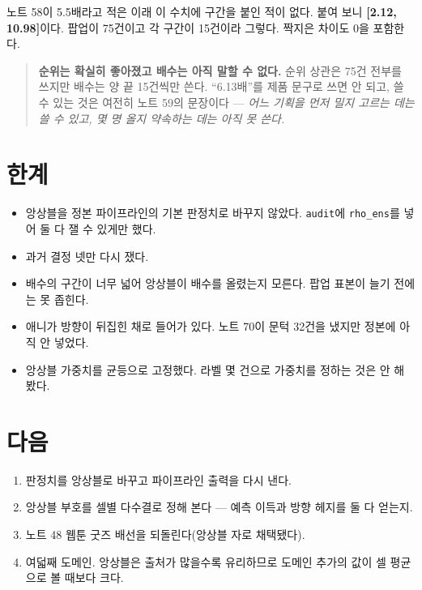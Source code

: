\documentclass[10pt]{article}
\begin{document}
노트 58이 5.5배라고 적은 이래 이 수치에 구간을 붙인 적이 없다. 붙여 보니
\textbf{{[}2.12, 10.98{]}}이다. 팝업이 75건이고 각 구간이 15건이라 그렇다.
짝지은 차이도 0을 포함한다.

\begin{quote}\fontsize{9.5}{11.5}\selectfont
\textbf{순위는 확실히 좋아졌고 배수는 아직 말할 수 없다.} 순위 상관은 75건
전부를 쓰지만 배수는 양 끝 15건씩만 쓴다. ``6.13배''를 제품 문구로 쓰면 안 되고,
쓸 수 있는 것은 여전히 노트 59의 문장이다 --- \emph{어느 기획을 먼저 밀지 고르는
데는 쓸 수 있고, 몇 명 올지 약속하는 데는 아직 못 쓴다.}
\end{quote}

\section{한계}

\begin{itemize}[leftmargin=1.1em,itemsep=0.15em]
\item 앙상블을 정본 파이프라인의 기본 판정치로 바꾸지 않았다. \texttt{audit}에
      \texttt{rho\_ens}를 넣어 둘 다 잴 수 있게만 했다.
\item 과거 결정 넷만 다시 쟀다.
\item 배수의 구간이 너무 넓어 앙상블이 배수를 올렸는지 모른다. 팝업 표본이
      늘기 전에는 못 좁힌다.
\item 애니가 방향이 뒤집힌 채로 들어가 있다. 노트 70이 문턱 32건을 냈지만
      정본에 아직 안 넣었다.
\item 앙상블 가중치를 균등으로 고정했다. 라벨 몇 건으로 가중치를 정하는 것은
      안 해 봤다.
\end{itemize}

\section{다음}

\begin{enumerate}[leftmargin=1.3em,itemsep=0.15em]
\item 판정치를 앙상블로 바꾸고 파이프라인 출력을 다시 낸다.
\item 앙상블 부호를 셀별 다수결로 정해 본다 --- 예측 이득과 방향 헤지를 둘 다
      얻는지.
\item 노트 48 웹툰 굿즈 배선을 되돌린다(앙상블 자로 채택됐다).
\item 여덟째 도메인. 앙상블은 출처가 많을수록 유리하므로 도메인 추가의 값이
      셀 평균으로 볼 때보다 크다.
\end{enumerate}
\end{document}
